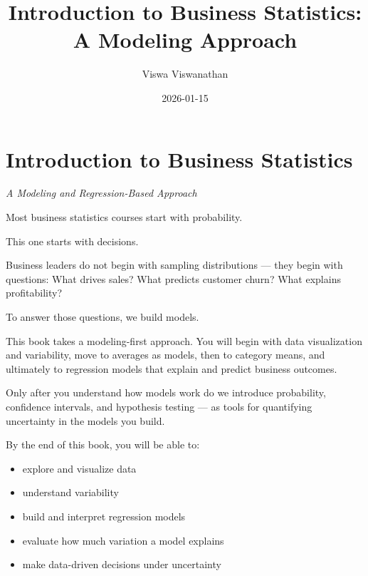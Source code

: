 \documentclass[
  12pt,
  letterpaper,
  DIV=11,
  numbers=noendperiod]{scrreprt}
\title{Introduction to Business Statistics: A Modeling Approach}
\author{Viswa Viswanathan}
\date{2026-01-15}
\providecommand{\tightlist}{%
  \setlength{\itemsep}{0pt}\setlength{\parskip}{0pt}}
\renewcommand*\contentsname{Table of contents}
\newcommand\contentsname{Table of contents}
\begin{document}
\maketitle

\renewcommand*\contentsname{Table of contents}
{
\hypersetup{linkcolor=}
\setcounter{tocdepth}{2}
\tableofcontents
}


\chapter*{Introduction to Business
Statistics}\label{introduction-to-business-statistics}


\emph{A Modeling and Regression-Based Approach}

Most business statistics courses start with probability.

This one starts with decisions.

Business leaders do not begin with sampling distributions --- they begin
with questions: What drives sales? What predicts customer churn? What
explains profitability?

To answer those questions, we build models.

This book takes a modeling-first approach. You will begin with data
visualization and variability, move to averages as models, then to
category means, and ultimately to regression models that explain and
predict business outcomes.

Only after you understand how models work do we introduce probability,
confidence intervals, and hypothesis testing --- as tools for
quantifying uncertainty in the models you build.

By the end of this book, you will be able to:

\begin{itemize}
\tightlist
\item
  explore and visualize data
\item
  understand variability
\item
  build and interpret regression models
\item
  evaluate how much variation a model explains
\item
  make data-driven decisions under uncertainty
\end{itemize}
\end{document}
